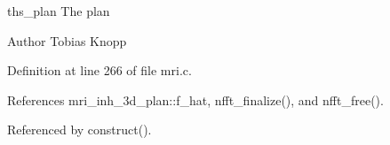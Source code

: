 \begin{DoxyItemize}
\item ths\-\_\-plan The plan\end{DoxyItemize}
\begin{DoxyAuthor}{Author}
Tobias Knopp 
\end{DoxyAuthor}


Definition at line 266 of file mri.\-c.



References mri\-\_\-inh\-\_\-3d\-\_\-plan\-::f\-\_\-hat, nfft\-\_\-finalize(), and nfft\-\_\-free().



Referenced by construct().

